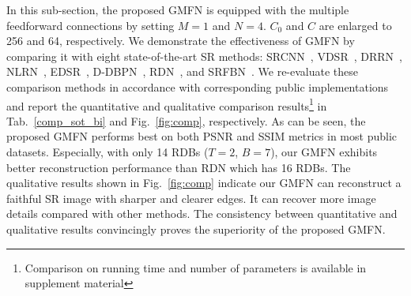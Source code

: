 \documentclass{bmvc2k}
\begin{document}
	In this sub-section, the proposed GMFN is equipped with the multiple feedforward connections by setting $M=1$ and $N=4$. $C_{0}$ and $C$ are enlarged to 256 and 64, respectively. We demonstrate the effectiveness of GMFN by comparing it with eight state-of-the-art SR methods: SRCNN~\cite{dong2014learning}, VDSR~\cite{kim2016accurate}, DRRN~\cite{tai2017image}, NLRN~\cite{nlrn2018}, EDSR~\cite{lim2017enhanced}, D-DBPN~\cite{haris2018deep}, RDN~\cite{zhang2018residual}, and SRFBN~\cite{li2019srfbn}. We re-evaluate these comparison methods in accordance with corresponding public implementations and report the quantitative and qualitative comparison results\footnote{Comparison on running time and number of parameters is available in supplement material} in Tab.~\ref{comp_sot_bi} and Fig.~\ref{fig:comp}, respectively. As can be seen, the proposed GMFN performs best on both PSNR and SSIM metrics in most public datasets. Especially, with only 14 RDBs ($T=2$, $B=7$), our GMFN exhibits better reconstruction performance than RDN which has 16 RDBs. The qualitative results shown in Fig.~\ref{fig:comp} indicate our GMFN can reconstruct a faithful SR image with sharper and clearer edges. It can recover more image details compared with other methods. The consistency between quantitative and qualitative results convincingly proves the superiority of the proposed GMFN. 
\end{document}

